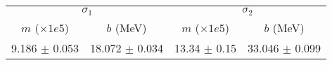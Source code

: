 \begin{tabular}{cc|cc}
\multicolumn{2}{c|}{$\sigma_1$} & \multicolumn{2}{|c}{$\sigma_2$} \\
$m$ ($\times1e5$) & $b$ (MeV) & $m$ ($\times1e5$) & $b$ (MeV) \\
\hline
9.186 $\pm$ 0.053 & 18.072 $\pm$ 0.034 & 13.34 $\pm$ 0.15 & 33.046 $\pm$ 0.099\\
\end{tabular}
